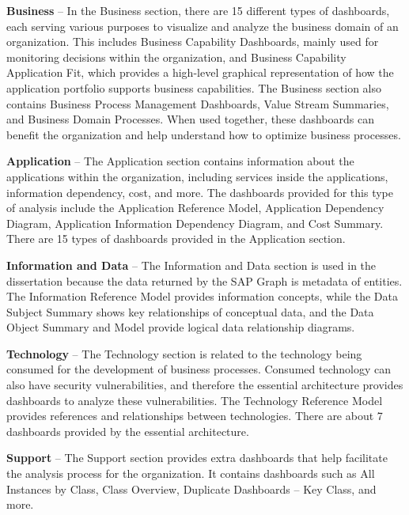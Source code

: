 \documentclass{article}
\begin{document}
\textbf{Business} – In the Business section, there are 15 different types of dashboards, each serving various purposes to visualize and analyze the business domain of an organization. This includes Business Capability Dashboards, mainly used for monitoring decisions within the organization, and Business Capability Application Fit, which provides a high-level graphical representation of how the application portfolio supports business capabilities. The Business section also contains Business Process Management Dashboards, Value Stream Summaries, and Business Domain Processes. When used together, these dashboards can benefit the organization and help understand how to optimize business processes.

\textbf{Application} – The Application section contains information about the applications within the organization, including services inside the applications, information dependency, cost, and more. The dashboards provided for this type of analysis include the Application Reference Model, Application Dependency Diagram, Application Information Dependency Diagram, and Cost Summary. There are 15 types of dashboards provided in the Application section.

\textbf{Information and Data} – The Information and Data section is used in the dissertation because the data returned by the SAP Graph is metadata of entities. The Information Reference Model provides information concepts, while the Data Subject Summary shows key relationships of conceptual data, and the Data Object Summary and Model provide logical data relationship diagrams.

\textbf{Technology} – The Technology section is related to the technology being consumed for the development of business processes. Consumed technology can also have security vulnerabilities, and therefore the essential architecture provides dashboards to analyze these vulnerabilities. The Technology Reference Model provides references and relationships between technologies. There are about 7 dashboards provided by the essential architecture.

\textbf{Support} – The Support section provides extra dashboards that help facilitate the analysis process for the organization. It contains dashboards such as All Instances by Class, Class Overview, Duplicate Dashboards – Key Class, and more.

\maketitle
\end{document}

